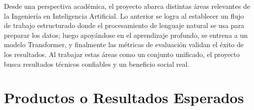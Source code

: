 \documentclass[10pt,letterpaper]{article}
\begin{document}
Desde una perspectiva académica, el proyecto abarca distintas áreas relevantes de la Ingeniería en Inteligencia Artificial. Lo anterior se logra al establecer un flujo de trabajo estructurado donde el procesamiento de lenguaje natural se usa para preparar los datos; luego apoyándose en el aprendizaje profundo, se entrena a un modelo Transformer, y finalmente las métricas de evaluación validan el éxito de los resultados. Al trabajar estas áreas como un conjunto unificado, el proyecto busca resultados técnicos confiables y un beneficio social real.









\section{Productos o Resultados Esperados}
\end{document}

